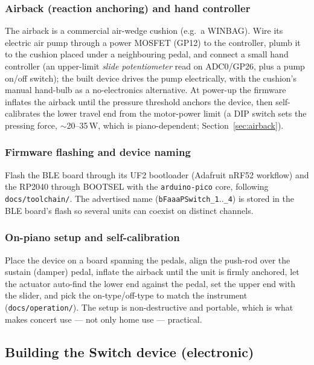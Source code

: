\subsubsection{Airback (reaction anchoring) and hand controller}
\label{sec:impl-pro-air}
The airback is a commercial air-wedge cushion (e.g.\ a WINBAG). Wire its electric
air pump through a power MOSFET (GP12) to the controller, plumb it to the cushion
placed under a neighbouring pedal, and connect a small hand controller (an
upper-limit \emph{slide potentiometer} read on ADC0/GP26, plus a pump on/off
switch); the built device drives the pump electrically, with the cushion's manual
hand-bulb as a no-electronics alternative. At power-up the firmware inflates the
airback until the pressure threshold anchors the device, then self-calibrates the
lower travel end from the motor-power limit (a DIP switch sets the pressing force,
$\sim$20--35\,W, which is piano-dependent; Section~\ref{sec:airback}).

\subsubsection{Firmware flashing and device naming}
\label{sec:impl-pro-fw}
Flash the BLE board through its UF2 bootloader (Adafruit nRF52 workflow) and the
RP2040 through BOOTSEL with the \texttt{arduino-pico} core, following
\texttt{docs/toolchain/}. The advertised name (\texttt{bFaaaPSwitch\_1}..\texttt{\_4})
is stored in the BLE board's flash so several units can coexist on distinct
channels.

\subsubsection{On-piano setup and self-calibration}
\label{sec:impl-pro-setup}
Place the device on a board spanning the pedals, align the push-rod over the
sustain (damper) pedal, inflate the airback until the unit is firmly anchored,
let the actuator auto-find the lower end against the pedal, set the upper end with
the slider, and pick the on-type/off-type to match the instrument
(\texttt{docs/operation/}). The setup is non-destructive and portable, which is
what makes concert use --- not only home use --- practical.

\subsection{Building the Switch device (electronic)}
\label{sec:impl-switch}

